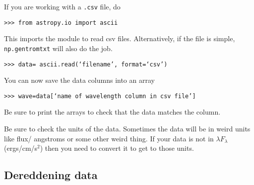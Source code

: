 \documentclass{article}
\begin{document}






\noindent If you are working with a \texttt{.csv} file, do

\vspace{2mm}
\texttt{>>> from astropy.io import ascii}  
\vspace{2mm}

\noindent This imports the module to read csv files. Alternatively, if the file is simple, \texttt{np.gentromtxt} will also do the job.

\vspace{2mm}
\texttt{>>> data= ascii.read(`filename', format=`csv')}
\vspace{2mm}

\noindent You can now save the data columns into an array

\vspace{2mm}
\texttt{>>> wave=data[`name of wavelength column in csv file']}
\vspace{2mm}

\noindent Be sure to print the arrays to check that the data matches the column.

\noindent Be sure to check the units of the data.  Sometimes the data will be in weird units like  flux/ angstroms or some other weird thing. If your data is not in $\lambda F_\lambda$ (ergs/cm/s$^2$) then you need to convert it to get to those units. 

\subsection{Dereddening data}
\end{document}
